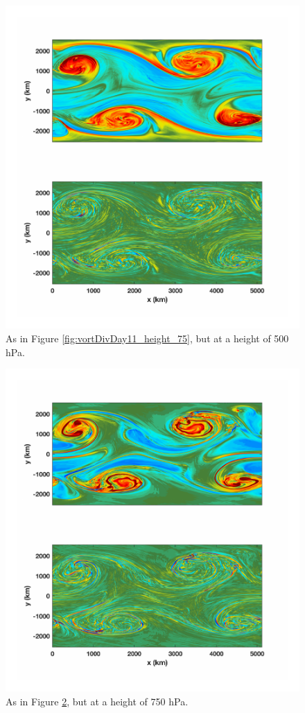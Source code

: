 \begin{figure}[H]
\vspace{-2em}
\includegraphics[scale=1]{Chapter3/img/vortDivDay11_height_50}
\caption{As in Figure \ref{fig:vortDivDay11_height_75}, but at a height of 500 hPa.}
\label{fig:vortDivDay11_height_50}
\end{figure}

\begin{figure}[H]
\vspace{-2em}
\includegraphics[scale=1]{Chapter3/img/vortDivDay11_height_25}
\caption{As in Figure \ref{fig:vortDivDay11_height_25}, but at a height of 750 hPa.}
\label{fig:vortDivDay11_height_25}
\end{figure}